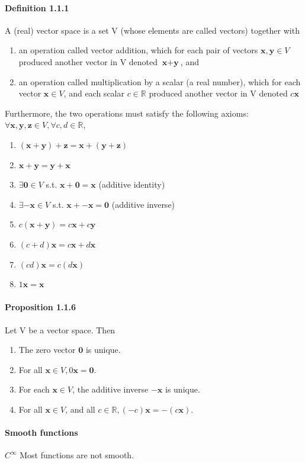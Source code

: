 \documentclass[11pt]{article}
\newcommand{\tb}[1]{\textbf{#1}}
\newcommand{\real}[0]{\mathbb{R}}
\newcommand{\vx}[0]{\tb{x}}
\newcommand{\vy}[0]{\tb{y}}
\newcommand{\vz}[0]{\tb{z}}
\newcommand{\vo}[0]{\tb{0}}
\begin{document}
	\paragraph{Definition 1.1.1} A (real) vector space is a set V (whose elements are called vectors) together with
	\begin{enumerate}
		\item an operation called vector addition, which for each pair of vectors $\vx, \vy \in V$ produced another vector in V denoted $\vx + \vy$, and
		\item an operation called multiplication by a scalar (a real number), which for each vector $\vx \in V$, and each scalar $c \in \real$ produced another vector in V denoted $c\vx$
	\end{enumerate}
	Furthermore, the two operations must satisfy the following axioms:
	$\forall \vx, \vy, \vz \in V, \forall c, d \in \real$,
	\begin{enumerate}
		\item $(\vx + \vy) + \vz = \vx + (\vy + \vz)$
		\item $\vx + \vy = \vy + \vx$
		\item $\exists \vo \in V$ s.t. $\vx + \vo = \vx$ (additive identity)
		\item $\exists -\vx \in V$ s.t. $\vx + -\vx = \vo$ (additive inverse)
		\item $c(\vx + \vy) = c\vx + c\vy$
		\item $(c + d)\vx = c\vx + d\vx$
		\item $(cd)\vx = c(d\vx)$
		\item $1\vx = \vx$
	\end{enumerate}
	\paragraph{Proposition 1.1.6}
	Let V be a vector space. Then
	\begin{enumerate}
		\item The zero vector $\vo$ is unique.
		\item For all $\vx \in V, 0\vx = \vo$.
		\item For each $\vx \in V$, the additive inverse $-\vx$ is unique.
		\item For all $\vx \in V$, and all $c \in \real, (-c)\vx = -(c\vx)$.
	\end{enumerate}
	\paragraph{Smooth functions}
	$C^\infty$ \newline
	Most functions are not smooth.
\end{document}
